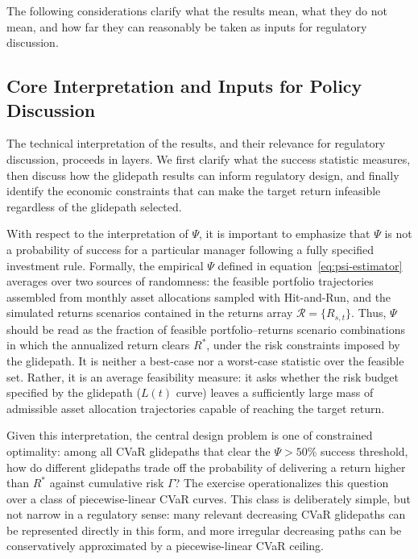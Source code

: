 \documentclass[11pt]{article}
\newcommand{\Rstar}{R^{*}}
\begin{document}
The following considerations clarify what the results mean, what they do not 
mean, and how far they can reasonably be taken as inputs for regulatory 
discussion.

\subsection{Core Interpretation and Inputs for Policy Discussion}

The technical interpretation of the results, and their relevance for regulatory discussion, proceeds in layers. We first clarify what the success statistic measures, then discuss how the glidepath results can inform regulatory design, and finally identify the economic constraints that can make the target return infeasible regardless of the glidepath selected.

With respect to the interpretation of $\Psi$, it is important to emphasize that $\Psi$ is not a probability of success for a particular manager following a fully specified investment rule. Formally, the empirical $\Psi$ defined in equation~\eqref{eq:psi-estimator} averages over two sources of randomness: the feasible portfolio trajectories assembled from monthly asset allocations sampled with Hit-and-Run, and the simulated returns scenarios contained in the returns  array $\mathcal{R}=\{R_{s,t}\}$. Thus, $\Psi$ should be read as the fraction of feasible portfolio--returns scenario combinations in which the annualized return clears $\Rstar$, under the risk constraints imposed by the glidepath. It is neither a best-case nor a worst-case statistic over the feasible set. Rather, it is an average feasibility measure: it asks whether the risk budget specified by the glidepath ($L(t)$ curve) leaves a sufficiently large mass of admissible  asset allocation trajectories capable of reaching the target return.

Given this interpretation, the central design problem is one of constrained 
optimality: among all CVaR glidepaths that clear the $\Psi > 50\%$ success 
threshold, how do different glidepaths trade off the probability of delivering a return higher than $R^*$ against cumulative risk $\Gamma$? The exercise operationalizes 
this question over a class of piecewise-linear CVaR curves. This class is 
deliberately simple, but not narrow in a regulatory sense: many relevant 
decreasing CVaR glidepaths can be represented directly in this form, and more 
irregular decreasing paths can be conservatively approximated by a 
piecewise-linear CVaR ceiling.
\end{document}
